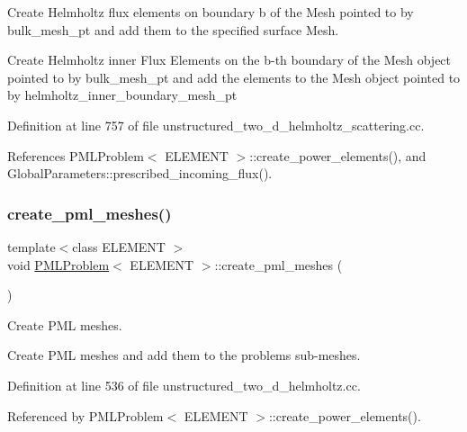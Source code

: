 Create Helmholtz flux elements on boundary b of the Mesh pointed to by bulk\+\_\+mesh\+\_\+pt and add them to the specified surface Mesh. 

Create Helmholtz inner Flux Elements on the b-\/th boundary of the Mesh object pointed to by bulk\+\_\+mesh\+\_\+pt and add the elements to the Mesh object pointed to by helmholtz\+\_\+inner\+\_\+boundary\+\_\+mesh\+\_\+pt 

Definition at line 757 of file unstructured\+\_\+two\+\_\+d\+\_\+helmholtz\+\_\+scattering.\+cc.



References P\+M\+L\+Problem$<$ E\+L\+E\+M\+E\+N\+T $>$\+::create\+\_\+power\+\_\+elements(), and Global\+Parameters\+::prescribed\+\_\+incoming\+\_\+flux().

\mbox{\label{classPMLProblem_aa111bfe53d52cf6b2e1bb3b079c16d43}} 
\subsubsection{\texorpdfstring{create\+\_\+pml\+\_\+meshes()}{create\_pml\_meshes()}\hspace{0.1cm}{\footnotesize\ttfamily [1/2]}}
{\footnotesize\ttfamily template$<$class E\+L\+E\+M\+E\+NT $>$ \\
void \hyperlink{classPMLProblem}{P\+M\+L\+Problem}$<$ E\+L\+E\+M\+E\+NT $>$\+::create\+\_\+pml\+\_\+meshes (\begin{DoxyParamCaption}{ }\end{DoxyParamCaption})}



Create P\+ML meshes. 

Create P\+ML meshes and add them to the problem\textquotesingle{}s sub-\/meshes. 

Definition at line 536 of file unstructured\+\_\+two\+\_\+d\+\_\+helmholtz.\+cc.



Referenced by P\+M\+L\+Problem$<$ E\+L\+E\+M\+E\+N\+T $>$\+::create\+\_\+power\+\_\+elements().

\mbox{\label{classPMLProblem_aa111bfe53d52cf6b2e1bb3b079c16d43}} 
